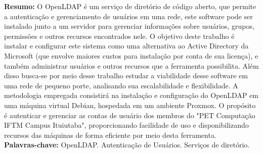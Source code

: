 \begin{singlespace}
\textbf{Resumo: }
O OpenLDAP é um serviço de diretório de código aberto, que permite a autenticação e gerenciamento de usuários em uma rede, este software pode ser instalado junto a um servidor para gerenciar informações sobre usuários, grupos, permissões e outros recursos encontrados nele. O objetivo deste trabalho é instalar e configurar este sistema como uma alternativa ao Active Directory da Microsoft (que envolve maiores custos para instalação por conta de sua licença), e também administrar usuários e outros recursos que a ferramenta possibilita. Além disso busca-se por meio desse trabalho estudar a viabilidade desse software em uma rede de pequeno porte, analisando sua escalabilidade e flexibilidade. A metodologia empregada consistirá na instalação e configuração do OpenLDAP em uma máquina virtual Debian, hospedada em um ambiente Proxmox. O propósito é autenticar e gerenciar as contas de usuário dos membros do "PET Computação IFTM Campus Ituiutaba", proporcionando facilidade de uso e disponibilizando recursos das máquinas de forma eficiente por meio desta ferramenta.\\
\textbf{Palavras-chave: }
OpenLDAP. Autenticação de Usuários. Serviços de diretório.
\end{singlespace}
